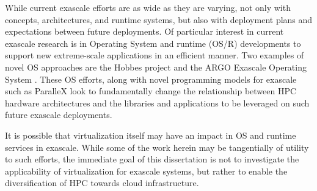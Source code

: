 While current exascale efforts are as wide as they are varying, not only with concepts, architectures, and runtime systems, but also with deployment plans and expectations between future deployments. Of particular interest in current exascale research is in Operating System and runtime (OS/R) developments to support new extreme-scale applications in an efficient manner. Two examples of novel OS approaches are the Hobbes project \cite{brightwell2013hobbes} and the ARGO Exascale Operating System \cite{perarnau2015argo}. These OS efforts, along with novel programming models for exascale such as ParalleX \cite{sterling2014} look to fundamentally change the relationship between HPC hardware architectures and the libraries and  applications to be leveraged on such future exascale deployments.   

 It is possible that virtualization itself may have an impact in OS and runtime services in exascale\cite{brightwell2013hobbes}. While some of the work herein may be tangentially of utility to such efforts, the immediate goal of this dissertation is not to investigate the applicability of virtualization for exascale systems, but rather to enable the diversification of HPC towards cloud infrastructure.


